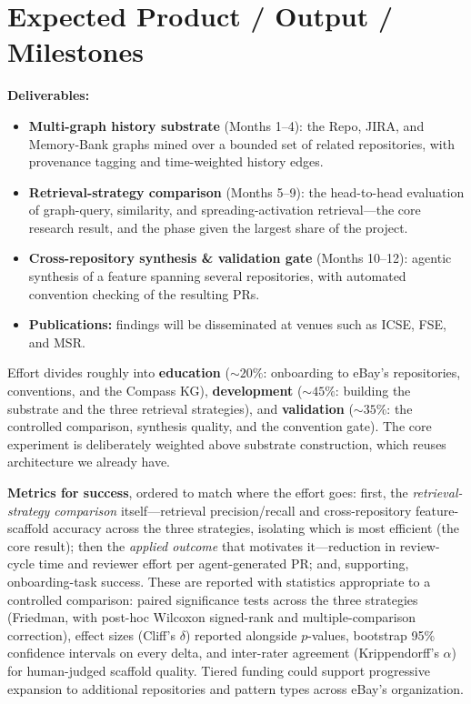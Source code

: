 \documentclass[11pt, letterpaper]{article}
\begin{document}
\section*{Expected Product / Output / Milestones}
\label{sec:output}

\textbf{Deliverables:}
\begin{itemize}
    \item \textbf{Multi-graph history substrate} (Months 1--4): the Repo, JIRA, and Memory-Bank graphs mined over a bounded set of related repositories, with provenance tagging and time-weighted history edges.
    \item \textbf{Retrieval-strategy comparison} (Months 5--9): the head-to-head evaluation of graph-query, similarity, and spreading-activation retrieval---the core research result, and the phase given the largest share of the project.
    \item \textbf{Cross-repository synthesis \& validation gate} (Months 10--12): agentic synthesis of a feature spanning several repositories, with automated convention checking of the resulting PRs.
    \item \textbf{Publications:} findings will be disseminated at venues such as ICSE, FSE, and MSR.
\end{itemize}

\noindent Effort divides roughly into \textbf{education} (${\sim}20\%$: onboarding to eBay's repositories, conventions, and the Compass KG), \textbf{development} (${\sim}45\%$: building the substrate and the three retrieval strategies), and \textbf{validation} (${\sim}35\%$: the controlled comparison, synthesis quality, and the convention gate). The core experiment is deliberately weighted above substrate construction, which reuses architecture we already have.

\textbf{Metrics for success}, ordered to match where the effort goes: first, the \emph{retrieval-strategy comparison} itself---retrieval precision/recall and cross-repository feature-scaffold accuracy across the three strategies, isolating which is most efficient (the core result); then the \emph{applied outcome} that motivates it---reduction in review-cycle time and reviewer effort per agent-generated PR; and, supporting, onboarding-task success. These are reported with statistics appropriate to a controlled comparison: paired significance tests across the three strategies (Friedman, with post-hoc Wilcoxon signed-rank and multiple-comparison correction), effect sizes (Cliff's $\delta$) reported alongside $p$-values, bootstrap 95\% confidence intervals on every delta, and inter-rater agreement (Krippendorff's $\alpha$) for human-judged scaffold quality. Tiered funding could support progressive expansion to additional repositories and pattern types across eBay's organization.
\end{document}
